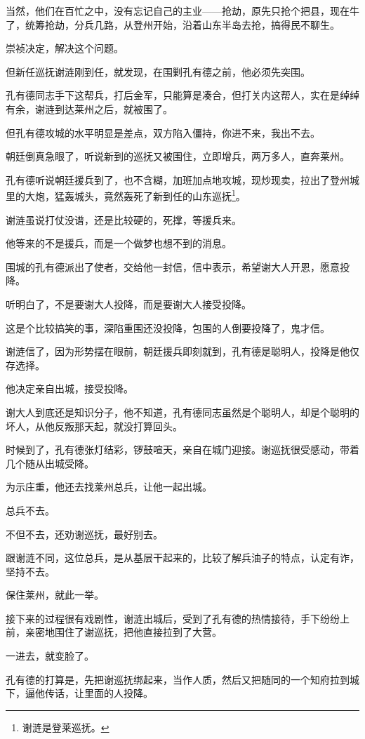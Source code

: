\begin{multicols}{\theparacolNo}
当然，他们在百忙之中，没有忘记自己的主业——抢劫，原先只抢个把县，现在牛了，统筹抢劫，分兵几路，从登州开始，沿着山东半岛去抢，搞得民不聊生。

崇祯决定，解决这个问题。

但新任巡抚谢涟刚到任，就发现，在围剿孔有德之前，他必须先突围。

孔有德同志手下这帮兵，打后金军，只能算是凑合，但打关内这帮人，实在是绰绰有余，谢涟到达莱州之后，就被围了。

但孔有德攻城的水平明显是差点，双方陷入僵持，你进不来，我出不去。

朝廷倒真急眼了，听说新到的巡抚又被围住，立即增兵，两万多人，直奔莱州。

孔有德听说朝廷援兵到了，也不含糊，加班加点地攻城，现炒现卖，拉出了登州城里的大炮，猛轰城头，竟然轰死了新到任的山东巡抚\footnote{谢涟是登莱巡抚。}。

谢涟虽说打仗没谱，还是比较硬的，死撑，等援兵来。

他等来的不是援兵，而是一个做梦也想不到的消息。

围城的孔有德派出了使者，交给他一封信，信中表示，希望谢大人开恩，愿意投降。

听明白了，不是要谢大人投降，而是要谢大人接受投降。

这是个比较搞笑的事，深陷重围还没投降，包围的人倒要投降了，鬼才信。

谢涟信了，因为形势摆在眼前，朝廷援兵即刻就到，孔有德是聪明人，投降是他仅存选择。

他决定亲自出城，接受投降。

谢大人到底还是知识分子，他不知道，孔有德同志虽然是个聪明人，却是个聪明的坏人，从他反叛那天起，就没打算回头。

时候到了，孔有德张灯结彩，锣鼓喧天，亲自在城门迎接。谢巡抚很受感动，带着几个随从出城受降。

为示庄重，他还去找莱州总兵，让他一起出城。

总兵不去。

不但不去，还劝谢巡抚，最好别去。

跟谢涟不同，这位总兵，是从基层干起来的，比较了解兵油子的特点，认定有诈，坚持不去。

保住莱州，就此一举。

接下来的过程很有戏剧性，谢涟出城后，受到了孔有德的热情接待，手下纷纷上前，亲密地围住了谢巡抚，把他直接拉到了大营。

一进去，就变脸了。

孔有德的打算是，先把谢巡抚绑起来，当作人质，然后又把随同的一个知府拉到城下，逼他传话，让里面的人投降。


\end{multicols}
